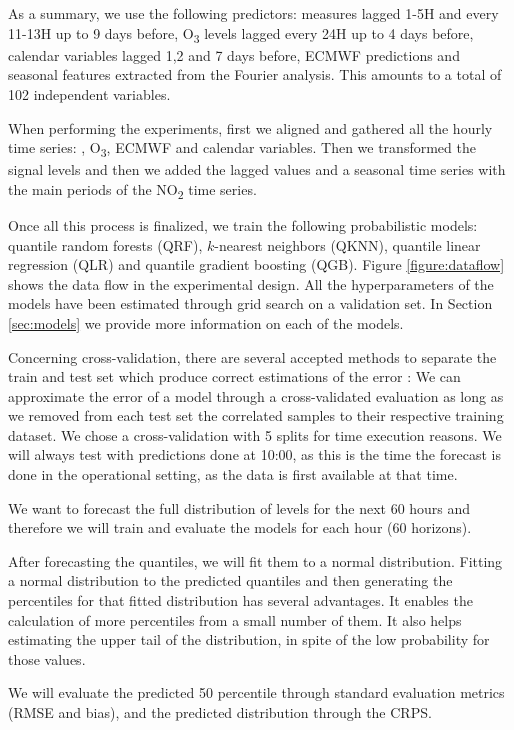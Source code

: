 \documentclass[a4paper,3p,sort&compress]{elsarticle}
\begin{document}
As a summary, we use the following predictors: \no
measures lagged 1-5H and every 11-13H up to 9 days before,
O\textsubscript{3} levels lagged every 24H up to 4 days before, 
calendar variables lagged 1,2 and 7 days before,
 ECMWF predictions and seasonal features extracted
from the Fourier analysis. This amounts to a total of 102 independent
variables. 

When performing the experiments, first we aligned and gathered all the
hourly time series: \no, O\textsubscript{3}, ECMWF and
calendar variables.  Then we transformed the signal levels and then we
added the lagged values and a seasonal time series with the main
periods of the NO\textsubscript{2} time series.

Once all this process is finalized, we train the following
probabilistic models: quantile random forests (QRF), $k$-nearest
neighbors (QKNN), quantile linear regression (QLR) and quantile
gradient boosting (QGB).  Figure \ref{figure:dataflow} shows the data
flow in the experimental design. All the hyperparameters of the models
have been estimated through grid search on a validation set.  
In Section \ref{sec:models}
we provide more information on each of the models.

Concerning cross-validation, there are several accepted methods to
separate the train and test set which produce correct estimations of
the error \cite{bergmeir_note_2018}: We can approximate the error of 
a model through a cross-validated evaluation as long as
 we removed from each test set the correlated samples to their respective 
 training 
 dataset. We chose a cross-validation with 5 splits for time execution 
 reasons. We will always test with predictions done at
10:00, as this is the time the forecast is done in the operational
setting, as the data is first available at that time. 

We want to forecast the full distribution of \no
levels for the next 60 hours and therefore we will train and evaluate
the models for each hour (60 horizons).

After forecasting the quantiles, we will fit them to a normal
distribution. Fitting a normal distribution to the predicted quantiles
and then generating the percentiles for that fitted distribution has
several advantages. It enables the calculation of more percentiles
from a small number of them.  It also helps estimating the upper tail
of the distribution, in spite of the low probability for those values.

We will evaluate the predicted 50 percentile through standard
evaluation metrics (RMSE and bias), and the predicted
distribution through the CRPS.
\end{document}

